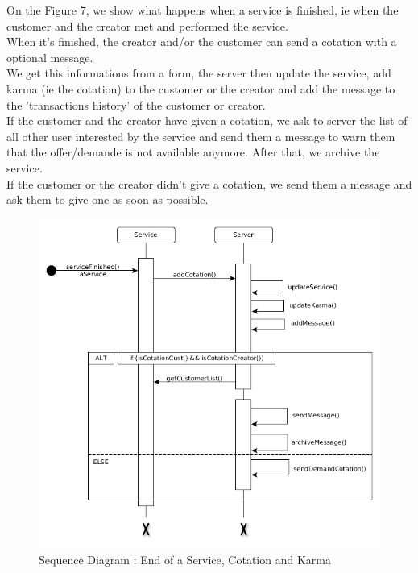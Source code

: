 On the Figure 7, we show what happens when a service is finished, ie when the customer and the creator met and performed the service.
\\ When it's finished, the creator and/or the customer can send a cotation with a optional message. 
\\ We get this informations from a form, the server then update the service, add karma (ie the cotation) to the customer or the creator and add the message to the 'transactions history' of the customer or creator.
\\ If the customer and the creator have given a cotation, we ask to server the list of all other user interested by the service and send them a message to warn them that the offer/demande is not available anymore. After that, we archive the service.
\\ If the customer or the creator didn't give a cotation, we send them a message and ask them to give one as soon as possible.

\begin{figure}[!ht]
	\begin{center}
		\includegraphics[width=\textwidth]{seq_serviceFinished.png}
		\caption{Sequence Diagram : End of a Service, Cotation and Karma}
		\label{fig:serviceFinished}
	\end{center}
\end{figure}


